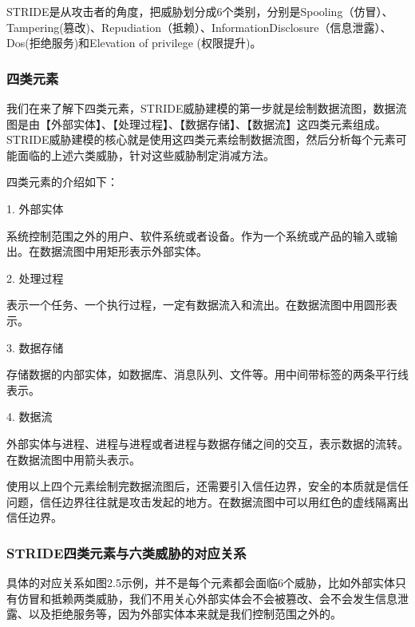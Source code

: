 STRIDE是从攻击者的角度，把威胁划分成6个类别，分别是Spooling（仿冒）、Tampering(篡改)、Repudiation（抵赖）、InformationDisclosure（信息泄露）、Dos(拒绝服务)和Elevation of privilege (权限提升)。

\subsubsection{四类元素}

我们在来了解下四类元素，STRIDE威胁建模的第一步就是绘制数据流图，数据流图是由【外部实体】、【处理过程】、【数据存储】、【数据流】这四类元素组成。
STRIDE威胁建模的核心就是使用这四类元素绘制数据流图，然后分析每个元素可能面临的上述六类威胁，针对这些威胁制定消减方法。

四类元素的介绍如下：

1.  外部实体

系统控制范围之外的用户、软件系统或者设备。作为一个系统或产品的输入或输出。在数据流图中用矩形表示外部实体。

2.  处理过程

表示一个任务、一个执行过程，一定有数据流入和流出。在数据流图中用圆形表示。

3.  数据存储

存储数据的内部实体，如数据库、消息队列、文件等。用中间带标签的两条平行线表示。

4.  数据流

外部实体与进程、进程与进程或者进程与数据存储之间的交互，表示数据的流转。在数据流图中用箭头表示。

使用以上四个元素绘制完数据流图后，还需要引入信任边界，安全的本质就是信任问题，信任边界往往就是攻击发起的地方。在数据流图中可以用红色的虚线隔离出信任边界。



\subsubsection{STRIDE四类元素与六类威胁的对应关系}

具体的对应关系如图2.5示例，并不是每个元素都会面临6个威胁，比如外部实体只有仿冒和抵赖两类威胁，我们不用关心外部实体会不会被篡改、会不会发生信息泄露、以及拒绝服务等，因为外部实体本来就是我们控制范围之外的。


